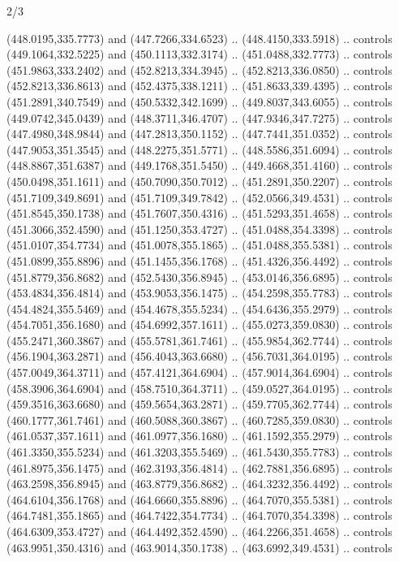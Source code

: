 \begin{flagdescription}{2/3}
\begin{scope}[xshift=0.5\flaglength,yshift=0.5\flagwidth,scale=\flagwidth/495.65]
\begin{scope}[y=0.8pt, x=0.8pt, yscale=-1,shift={(-463.76,-309.78)}]
  (448.0195,335.7773) and (447.7266,334.6523) .. (448.4150,333.5918) .. controls
  (449.1064,332.5225) and (450.1113,332.3174) .. (451.0488,332.7773) .. controls
  (451.9863,333.2402) and (452.8213,334.3945) .. (452.8213,336.0850) .. controls
  (452.8213,336.8613) and (452.4375,338.1211) .. (451.8633,339.4395) .. controls
  (451.2891,340.7549) and (450.5332,342.1699) .. (449.8037,343.6055) .. controls
  (449.0742,345.0439) and (448.3711,346.4707) .. (447.9346,347.7275) .. controls
  (447.4980,348.9844) and (447.2813,350.1152) .. (447.7441,351.0352) .. controls
  (447.9053,351.3545) and (448.2275,351.5771) .. (448.5586,351.6094) .. controls
  (448.8867,351.6387) and (449.1768,351.5450) .. (449.4668,351.4160) .. controls
  (450.0498,351.1611) and (450.7090,350.7012) .. (451.2891,350.2207) .. controls
  (451.7109,349.8691) and (451.7109,349.7842) .. (452.0566,349.4531) .. controls
  (451.8545,350.1738) and (451.7607,350.4316) .. (451.5293,351.4658) .. controls
  (451.3066,352.4590) and (451.1250,353.4727) .. (451.0488,354.3398) .. controls
  (451.0107,354.7734) and (451.0078,355.1865) .. (451.0488,355.5381) .. controls
  (451.0899,355.8896) and (451.1455,356.1768) .. (451.4326,356.4492) .. controls
  (451.8779,356.8682) and (452.5430,356.8945) .. (453.0146,356.6895) .. controls
  (453.4834,356.4814) and (453.9053,356.1475) .. (454.2598,355.7783) .. controls
  (454.4824,355.5469) and (454.4678,355.5234) .. (454.6436,355.2979) .. controls
  (454.7051,356.1680) and (454.6992,357.1611) .. (455.0273,359.0830) .. controls
  (455.2471,360.3867) and (455.5781,361.7461) .. (455.9854,362.7744) .. controls
  (456.1904,363.2871) and (456.4043,363.6680) .. (456.7031,364.0195) .. controls
  (457.0049,364.3711) and (457.4121,364.6904) .. (457.9014,364.6904) .. controls
  (458.3906,364.6904) and (458.7510,364.3711) .. (459.0527,364.0195) .. controls
  (459.3516,363.6680) and (459.5654,363.2871) .. (459.7705,362.7744) .. controls
  (460.1777,361.7461) and (460.5088,360.3867) .. (460.7285,359.0830) .. controls
  (461.0537,357.1611) and (461.0977,356.1680) .. (461.1592,355.2979) .. controls
  (461.3350,355.5234) and (461.3203,355.5469) .. (461.5430,355.7783) .. controls
  (461.8975,356.1475) and (462.3193,356.4814) .. (462.7881,356.6895) .. controls
  (463.2598,356.8945) and (463.8779,356.8682) .. (464.3232,356.4492) .. controls
  (464.6104,356.1768) and (464.6660,355.8896) .. (464.7070,355.5381) .. controls
  (464.7481,355.1865) and (464.7422,354.7734) .. (464.7070,354.3398) .. controls
  (464.6309,353.4727) and (464.4492,352.4590) .. (464.2266,351.4658) .. controls
  (463.9951,350.4316) and (463.9014,350.1738) .. (463.6992,349.4531) .. controls

\end{scope}
\end{scope}
\end{flagdescription}
